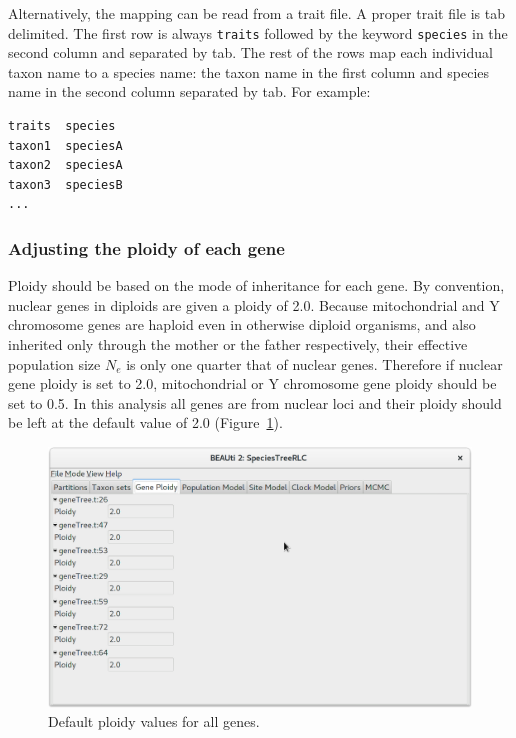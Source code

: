 \documentclass{article}
\begin{document}
Alternatively, the mapping can be read from a trait file. A proper trait file is
tab delimited. The first row is always \texttt{traits} followed by the keyword
\texttt{species} in the second column and separated by tab. The rest of the rows
map each individual taxon name to a species name: the taxon name in the first
column and species name in the second column separated by tab. For example:

\begin{minipage}[h]{0.7\textwidth}
\begin{verbatim}
traits	species
taxon1	speciesA
taxon2	speciesA
taxon3	speciesB
...
\end{verbatim}
\end{minipage}

\vspace{12pt}

\subsubsection*{Adjusting the ploidy of each gene}

Ploidy should be based on the mode of inheritance for each gene. By convention,
nuclear genes in diploids are given a ploidy of 2.0. Because mitochondrial and Y
chromosome genes are haploid even in otherwise diploid organisms, and also
inherited only through the mother or the father respectively, their effective
population size $N_e$ is only one quarter that of nuclear genes. Therefore if
nuclear gene ploidy is set to 2.0, mitochondrial or Y chromosome gene ploidy
should be set to 0.5. In this analysis all genes are from nuclear loci and their
ploidy should be left at the default value of 2.0 (Figure~\ref{fig:ploidy}).

\begin{figure}[htb!]
\centering
\includegraphics[width=\textwidth]{figures/beauti-ploidy.png}
\caption{Default ploidy values for all genes.}
\label{fig:ploidy}
\end{figure}
\end{document}

